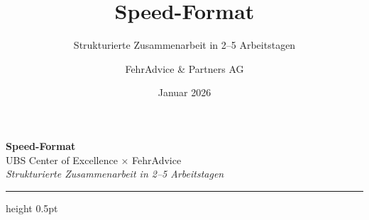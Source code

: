 \documentclass{fehradvice-report}
\title{Speed-Format}
\subtitle{Strukturierte Zusammenarbeit in 2–5 Arbeitstagen}
\author{FehrAdvice \& Partners AG}
\date{Januar 2026}
\begin{document}
\begin{center}
{\color{fadarkblue}\fontsize{24}{28}\selectfont\textbf{Speed-Format}}\\[4pt]
{\color{fadarkgray}\large UBS Center of Excellence × FehrAdvice}\\[2pt]
{\color{falightblue}\textit{Strukturierte Zusammenarbeit in 2–5 Arbeitstagen}}
\end{center}

\vspace{4mm}
\hrule height 0.5pt
\vspace{4mm}

\end{document}
